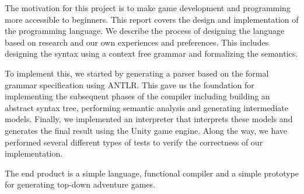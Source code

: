 The motivation for this project is to make game development and programming more accessible to beginners.
This report covers the design and implementation of the \dazel{} programming language.
We describe the process of designing the language based on research and our own experiences and preferences.
This includes designing the syntax using a context free grammar and formalizing the semantics.

To implement this, we started by generating a parser based on the formal grammar specification using ANTLR.
This gave us the foundation for implementing the subsequent phases of the \dazel{} compiler including building an abstract syntax tree, performing semantic analysis and generating intermediate models. 
Finally, we implemented an interpreter that interprets these models and generates the final result using the Unity game engine.
Along the way, we have performed several different types of tests to verify the correctness of our implementation.

The end product is a simple language, functional compiler and a simple prototype for generating top-down adventure games.